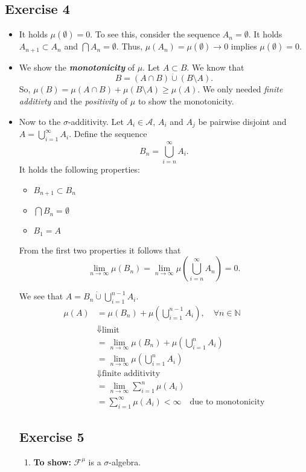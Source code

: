 \documentclass[a4paper]{article}
\newcommand{\vip}[1]{\textit{\textbf{#1}}}
\begin{document}
\subsection*{Exercise 4}

\begin{itemize}
\item It holds $\mu(\emptyset) = 0$. To see this, consider the sequence $A_n = \emptyset$. It holds $A_{n+1} \subset A_n$ and $\bigcap A_n = \emptyset$. Thus, $\mu(A_n) = \mu(\emptyset) \to 0$ implies $\mu(\emptyset) = 0$.

\item We show the \vip{monotonicity} of $\mu$. Let $A \subset B$. We know that
\[
	B = (A \cap B) \dot \cup (B \setminus A).
\]
So, $\mu(B) = \mu(A \cap B) + \mu (B \setminus A) \geq \mu(A)$. We only needed \emph{finite additivty} and the \emph{positivity} of $\mu$ to show the monotonicity.

\item Now to the $\sigma$-additivity. Let $A_i \in \mathcal A$, $A_i$ and $A_j$ be pairwise disjoint and $A = \bigcup^\infty_{i=1} A_i$. Define the sequence
\[
	B_n = \bigcup^\infty_{i=n}A_i.
\]	
It holds the following properties:
\begin{itemize}
\item $B_{n+1} \subset B_{n}$
\item $\bigcap B_n = \emptyset$
\item $B_1 = A$
\end{itemize}

From the first two properties it follows that $$\lim_{n \to \infty}\mu(B_n) = \lim_{n \to \infty} \mu(\bigcup_{i=n}^\infty A_n) = 0.$$

We see that $A = B_n \dot \cup \bigcup^{n-1}_{i=1}A_i$.
\begin{align*}
	\mu(A) &= \mu(B_n) + \mu (\bigcup^{n-1}_{i=1}A_i), \quad \forall n \in \mathbb N\\
	&\Downarrow \text{limit} \\
	&= \lim_{n \to \infty} \mu(B_n) +  \mu (\bigcup^{n}_{i=1}A_i) \\
	&= \lim_{n \to \infty} \mu (\bigcup^{n}_{i=1}A_i) \\
	&\Downarrow \text{finite additivity} \\
	&= \lim_{n \to \infty} \sum^n_{i=1}\mu(A_i)\\
	&= \sum^\infty_{i=1}\mu(A_i) < \infty \quad \text{due to monotonicity}
\end{align*}

\subsection*{Exercise 5}
\begin{enumerate}[label=(\alph*)]
\item \textbf{To show:} $\mathcal F^\mu$ is a $\sigma$-algebra.


\end{enumerate}
\end{itemize}
\end{document}
